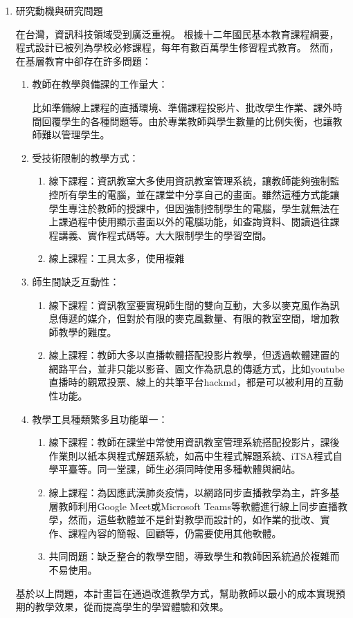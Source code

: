 \documentclass[12pt]{article}
\begin{document}
\begin{enumerate}
  \item 研究動機與研究問題
    \par 在台灣，資訊科技領域受到廣泛重視。
    根據十二年國民基本教育課程綱要\cite{ref1}，
    程式設計已被列為學校必修課程，每年有數百萬學生修習程式教育。
    然而，在基層教育中卻存在許多問題：
    \begin{enumerate}
      \setlength{\parindent}{2em}
      \item 教師在教學與備課的工作量大：
        \par 比如準備線上課程的直播環境、準備課程投影片、批改學生作業、課外時間回覆學生的各種問題等。由於專業教師與學生數量的比例失衡，也讓教師難以管理學生。\cite{ref2}
      \item 受技術限制的教學方式：
        \begin{enumerate}
          \item 線下課程：資訊教室大多使用資訊教室管理系統，讓教師能夠強制監控所有學生的電腦，並在課堂中分享自己的畫面。雖然這種方式能讓學生專注於教師的授課中，但因強制控制學生的電腦，學生就無法在上課過程中使用顯示畫面以外的電腦功能，如查詢資料、閱讀過往課程講義、實作程式碼等。大大限制學生的學習空間。
          \item 線上課程：工具太多，使用複雜
        \end{enumerate}
      \item 師生間缺乏互動性：
        \begin{enumerate}
          \item 線下課程：資訊教室要實現師生間的雙向互動，大多以麥克風作為訊息傳遞的媒介，但對於有限的麥克風數量、有限的教室空間，增加教師教學的難度。
          \item 線上課程：教師大多以直播軟體搭配投影片教學，但透過軟體建置的網路平台，並非只能以影音、圖文作為訊息的傳遞方式，比如youtube直播時的觀眾投票、線上的共筆平台hackmd，都是可以被利用的互動性功能。
        \end{enumerate}
      \item 教學工具種類繁多且功能單一：
        \begin{enumerate}
          \item 線下課程：教師在課堂中常使用資訊教室管理系統搭配投影片，課後作業則以紙本與程式解題系統，如高中生程式解題系統、iTSA程式自學平臺等。同一堂課，師生必須同時使用多種軟體與網站。
          \item 線上課程：為因應武漢肺炎疫情，以網路同步直播教學為主，許多基層教師利用Google Meet或Microsoft Teams等軟體進行線上同步直播教學，然而，這些軟體並不是針對教學而設計的，如作業的批改、實作、課程內容的簡報、回顧等，仍需要使用其他軟體。
          \item 共同問題：缺乏整合的教學空間，導致學生和教師因系統過於複雜而不易使用。
        \end{enumerate}
    \end{enumerate}
    \par 基於以上問題，本計畫旨在通過改進教學方式，幫助教師以最小的成本實現預期的教學效果，從而提高學生的學習體驗和效果。
    

\end{enumerate}
\end{document}
